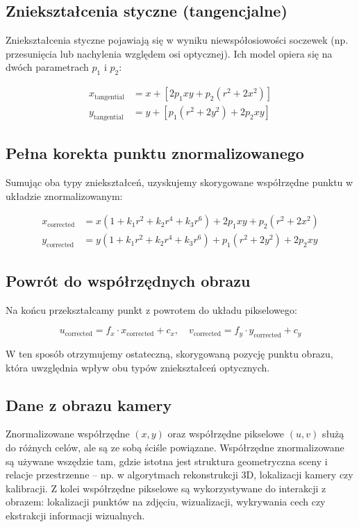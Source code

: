 \documentclass[magisterska]{pracadypl}
\begin{document}
\subsection*{Zniekształcenia styczne (tangencjalne)}

Zniekształcenia styczne pojawiają się w wyniku niewspółosiowości soczewek (np. przesunięcia lub nachylenia względem osi optycznej). Ich model opiera się na dwóch parametrach \( p_1 \) i \( p_2 \):

\begin{align*}
x_{\text{tangential}} &= x + \left[2p_1 x y + p_2 (r^2 + 2x^2)\right] \\
y_{\text{tangential}} &= y + \left[p_1 (r^2 + 2y^2) + 2p_2 x y\right]
\end{align*}

\subsection*{Pełna korekta punktu znormalizowanego}

Sumując oba typy zniekształceń, uzyskujemy skorygowane współrzędne punktu w układzie znormalizowanym:

\begin{align*}
x_{\text{corrected}} &= x(1 + k_1 r^2 + k_2 r^4 + k_3 r^6) + 2p_1 x y + p_2 (r^2 + 2x^2) \\
y_{\text{corrected}} &= y(1 + k_1 r^2 + k_2 r^4 + k_3 r^6) + p_1 (r^2 + 2y^2) + 2p_2 x y
\end{align*}

\subsection*{Powrót do współrzędnych obrazu}

Na końcu przekształcamy punkt z powrotem do układu pikselowego:

\[
u_{\text{corrected}} = f_x \cdot x_{\text{corrected}} + c_x, \quad
v_{\text{corrected}} = f_y \cdot y_{\text{corrected}} + c_y
\]

W ten sposób otrzymujemy ostateczną, skorygowaną pozycję punktu obrazu, która uwzględnia wpływ obu typów zniekształceń optycznych.

\subsection{Dane z obrazu kamery}

Znormalizowane współrzędne $(x, y)$ oraz współrzędne pikselowe $(u, v)$ służą do różnych celów, ale są ze sobą ściśle powiązane. Współrzędne znormalizowane są używane wszędzie tam, gdzie istotna jest struktura geometryczna sceny i relacje przestrzenne – np. w algorytmach rekonstrukcji 3D, lokalizacji kamery czy kalibracji. Z kolei współrzędne pikselowe są wykorzystywane do interakcji z obrazem: lokalizacji punktów na zdjęciu, wizualizacji, wykrywania cech czy ekstrakcji informacji wizualnych.
\end{document}
